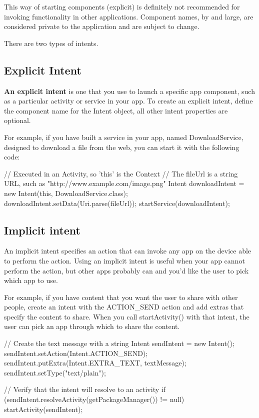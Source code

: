 \begin{framed}
		This way of starting components (explicit) is definitely  not recommended for invoking functionality in
		other applications. Component names, by and large, are considered private to the application and are subject to change.
\end{framed}

There are two types of intents.


\subsection{Explicit Intent}
\textbf{An explicit intent} is one that you use to launch a specific app component, such as a particular activity or service in your app. To create an explicit intent, define the component name for the Intent object, all other intent properties are optional.

For example, if you have built a service in your app, named DownloadService, designed to download a file from the web, you can start it with the following code:

\begin{android}
// Executed in an Activity, so 'this' is the Context
// The fileUrl is a string URL, such as "http://www.example.com/image.png"
Intent downloadIntent = new Intent(this, DownloadService.class);
downloadIntent.setData(Uri.parse(fileUrl));
startService(downloadIntent);
\end{android}

\subsection{Implicit intent}
An implicit intent specifies an action that can invoke any app on the device able to perform the action. Using an implicit intent is useful when your app cannot perform the action, but other apps probably can and you'd like the user to pick which app to use.

For example, if you have content that you want the user to share with other people, create an intent with the ACTION\_SEND action and add extras that specify the content to share. When you call startActivity() with that intent, the user can pick an app through which to share the content.

\begin{android}
// Create the text message with a string
Intent sendIntent = new Intent();
sendIntent.setAction(Intent.ACTION_SEND);
sendIntent.putExtra(Intent.EXTRA_TEXT, textMessage);
sendIntent.setType("text/plain");

// Verify that the intent will resolve to an activity
if (sendIntent.resolveActivity(getPackageManager()) != null) {
	startActivity(sendIntent);
}
\end{android}

